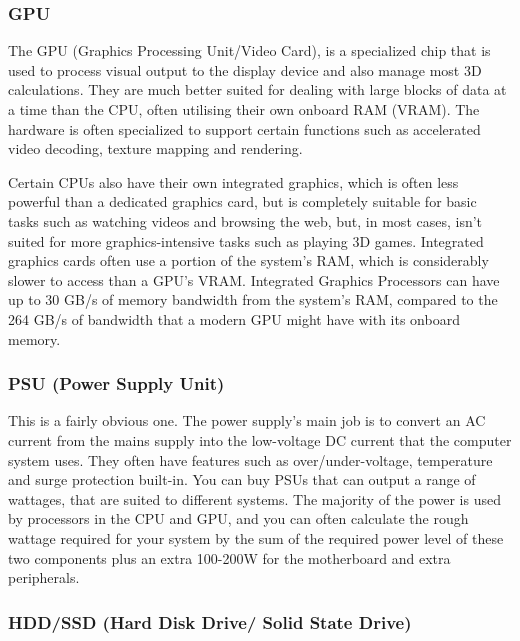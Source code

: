 \hypertarget{gpu}{%
\subsubsection{GPU}\label{gpu}}

The GPU (Graphics Processing Unit/Video Card), is a specialized chip that is used to process visual output to the display device and also manage most 3D calculations. They are much better suited for dealing with large blocks of data at a time than the CPU, often utilising their own onboard RAM (VRAM). The hardware is often specialized to support certain functions such as accelerated video decoding, texture mapping and rendering.

Certain CPUs also have their own integrated graphics, which is often less powerful than a dedicated graphics card, but is completely suitable for basic tasks such as watching videos and browsing the web, but, in most cases, isn't suited for more graphics-intensive tasks such as playing 3D games. Integrated graphics cards often use a portion of the system's RAM, which is considerably slower to access than a GPU's VRAM. Integrated Graphics Processors can have up to 30 GB/s of memory bandwidth from the system's RAM, compared to the 264 GB/s of bandwidth that a modern GPU might have with its onboard memory.

\hypertarget{psu-power-supply-unit}{%
\subsubsection{PSU (Power Supply Unit)}\label{psu-power-supply-unit}}

This is a fairly obvious one. The power supply's main job is to convert an AC current from the mains supply into the low-voltage DC current that the computer system uses. They often have features such as over/under-voltage, temperature and surge protection built-in. You can buy PSUs that can output a range of wattages, that are suited to different systems. The majority of the power is used by processors in the CPU and GPU, and you can often calculate the rough wattage required for your system by the sum of the required power level of these two components plus an extra 100-200W for the motherboard and extra peripherals.

\hypertarget{hddssd-hard-disk-drive-solid-state-drive}{%
\subsubsection{HDD/SSD (Hard Disk Drive/ Solid State Drive)}\label{hddssd-hard-disk-drive-solid-state-drive}}

